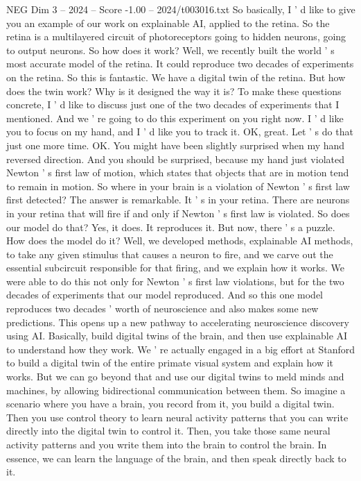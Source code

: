 \begin{textsample}{NEG Dim 3 – 2024 – Score -1.00 – 2024/t003016.txt}
So basically, I ' d like to give you an example of our work on explainable AI, applied to the retina.
So the retina is a multilayered circuit of photoreceptors going to hidden neurons, going to output neurons.
So how does it work?
Well, we recently built the world ' s most accurate model of the retina.
It could reproduce two decades of experiments on the retina.
So this is fantastic.
We have a digital twin of the retina.
But how does the twin work?
Why is it designed the way it is?
To make these questions concrete, I ' d like to discuss just one of the two decades of experiments that I mentioned.
And we ' re going to do this experiment on you right now.
I ' d like you to focus on my hand, and I ' d like you to track it.
OK, great.
Let ' s do that just one more time.
OK.
You might have been slightly surprised when my hand reversed direction.
And you should be surprised, because my hand just violated Newton ' s first law of motion, which states that objects that are in motion tend to remain in motion.
So where in your brain is a violation of Newton ' s first law first detected?
The answer is remarkable.
It ' s in your retina.
There are neurons in your retina that will fire if and only if Newton ' s first law is violated.
So does our model do that?
Yes, it does.
It reproduces it.
But now, there ' s a puzzle.
How does the model do it?
Well, we developed methods, explainable AI methods, to take any given stimulus that causes a neuron to fire, and we carve out the essential subcircuit responsible for that firing, and we explain how it works.
We were able to do this not only for Newton ' s first law violations, but for the two decades of experiments that our model reproduced.
And so this one model reproduces two decades ' worth of neuroscience and also makes some new predictions.
This opens up a new pathway to accelerating neuroscience discovery using AI.
Basically, build digital twins of the brain, and then use explainable AI to understand how they work.
We ' re actually engaged in a big effort at Stanford to build a digital twin of the entire primate visual system and explain how it works.
But we can go beyond that and use our digital twins to meld minds and machines, by allowing bidirectional communication between them.
So imagine a scenario where you have a brain, you record from it, you build a digital twin.
Then you use control theory to learn neural activity patterns that you can write directly into the digital twin to control it.
Then, you take those same neural activity patterns and you write them into the brain to control the brain.
In essence, we can learn the language of the brain, and then speak directly back to it.

\end{textsample}
